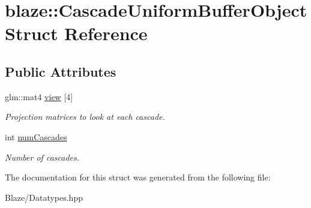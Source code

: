 \hypertarget{structblaze_1_1CascadeUniformBufferObject}{}\section{blaze\+:\+:Cascade\+Uniform\+Buffer\+Object Struct Reference}
\label{structblaze_1_1CascadeUniformBufferObject}
\subsection*{Public Attributes}
\begin{DoxyCompactItemize}
\item 
\mbox{\label{structblaze_1_1CascadeUniformBufferObject_ae9d303d5881eb6baa631d5d354e6e884}} 
glm\+::mat4 \hyperlink{structblaze_1_1CascadeUniformBufferObject_ae9d303d5881eb6baa631d5d354e6e884}{view} \mbox{[}4\mbox{]}
\begin{DoxyCompactList}\small\item\em Projection matrices to look at each cascade. \end{DoxyCompactList}\item 
\mbox{\label{structblaze_1_1CascadeUniformBufferObject_ae211cf54e80524c8d32ceef4938f5140}} 
int \hyperlink{structblaze_1_1CascadeUniformBufferObject_ae211cf54e80524c8d32ceef4938f5140}{num\+Cascades}
\begin{DoxyCompactList}\small\item\em Number of cascades. \end{DoxyCompactList}\end{DoxyCompactItemize}


The documentation for this struct was generated from the following file\+:\begin{DoxyCompactItemize}
\item 
Blaze/Datatypes.\+hpp\end{DoxyCompactItemize}
